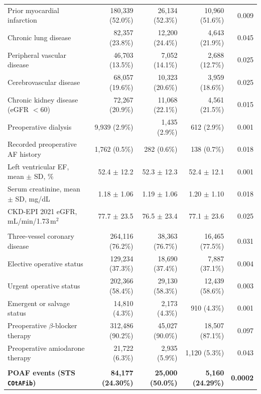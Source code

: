 \begin{table}[t]
\begin{tabularx}{\textwidth}{@{}Yrrrr@{}}
\quad Prior myocardial infarction & 180,339 (52.0\%) & 26,134 (52.3\%) & 10,960 (51.6\%) & 0.009 \\
\quad Chronic lung disease & 82,357 (23.8\%) & 12,200 (24.4\%) & 4,643 (21.9\%) & 0.045 \\
\quad Peripheral vascular disease & 46,703 (13.5\%) & 7,052 (14.1\%) & 2,688 (12.7\%) & 0.025 \\
\quad Cerebrovascular disease & 68,057 (19.6\%) & 10,323 (20.6\%) & 3,959 (18.6\%) & 0.025 \\
\quad Chronic kidney disease (eGFR $<60$) & 72,267 (20.9\%) & 11,068 (22.1\%) & 4,561 (21.5\%) & 0.015 \\
\quad Preoperative dialysis & 9,939 (2.9\%) & 1,435 (2.9\%) & 612 (2.9\%) & 0.001 \\
\quad Recorded preoperative AF history & 1,762 (0.5\%) & 282 (0.6\%) & 138 (0.7\%) & 0.018 \\
\quad Left ventricular EF, mean $\pm$ SD, \% & 52.4 $\pm$ 12.2 & 52.3 $\pm$ 12.3 & 52.4 $\pm$ 12.1 & 0.001 \\
\quad Serum creatinine, mean $\pm$ SD, mg/dL & 1.18 $\pm$ 1.06 & 1.19 $\pm$ 1.06 & 1.20 $\pm$ 1.10 & 0.018 \\
\quad CKD-EPI 2021 eGFR, mL/min/1.73\,m$^2$ & 77.7 $\pm$ 23.5 & 76.5 $\pm$ 23.4 & 77.1 $\pm$ 23.6 & 0.025 \\
\addlinespace[3pt]
 \\
\quad Three-vessel coronary disease & 264,116 (76.2\%) & 38,363 (76.7\%) & 16,465 (77.5\%) & 0.031 \\
\quad Elective operative status & 129,234 (37.3\%) & 18,690 (37.4\%) & 7,887 (37.1\%) & 0.004 \\
\quad Urgent operative status & 202,366 (58.4\%) & 29,130 (58.3\%) & 12,439 (58.6\%) & 0.003 \\
\quad Emergent or salvage status & 14,810 (4.3\%) & 2,173 (4.3\%) & 910 (4.3\%) & 0.001 \\
\quad Preoperative $\beta$-blocker therapy & 312,486 (90.2\%) & 45,027 (90.0\%) & 18,507 (87.1\%) & 0.097 \\
\quad Preoperative amiodarone therapy & 21,722 (6.3\%) & 2,935 (5.9\%) & 1,120 (5.3\%) & 0.043 \\
\addlinespace[3pt]
 \\
\quad \textbf{POAF events (STS \texttt{COtAFib})} & \textbf{84,177 (24.30\%)} & \textbf{25,000 (50.0\%)} & \textbf{5,160 (24.29\%)} & \textbf{0.0002} \\

\end{tabularx}
\end{table}
